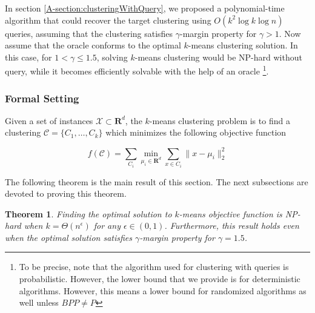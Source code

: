 \documentclass{article}
\newcommand{\mc}{\mathcal}
\newcommand{\mb}{\mathbf}
\newtheorem{theorem}{Theorem}
\begin{document}
In section \ref{A-section:clusteringWithQuery}, we proposed a polynomial-time algorithm that could recover the target clustering using $O(k^2\log k \log n)$ queries, assuming that the clustering satisfies $\gamma$-margin property for $\gamma>1$. Now assume that the oracle conforms to the optimal $k$-means clustering solution. In this case, for $1<\gamma\le 1.5$, solving $k$-means clustering would be NP-hard without query, while it becomes efficiently solvable with the help of an oracle \footnote{To be precise, note that the algorithm used for clustering with queries is probabilistic. However, the lower bound that we provide is for deterministic algorithms. However, this means a lower bound for randomized algorithms as well unless $BPP\neq P$}. 

\subsubsection{Formal Setting}

Given a set of instances $\mc X \subset \mb R ^d$, the $k$-means clustering problem is to find a clustering $\mc C = \{C_1, \ldots, C_k\}$ which minimizes the following objective function

$$f(\mc C) = \sum\limits_{C_i} \min\limits_{\mu_i\in {\mb R}^d}\sum\limits_{x\in C_i} \|x - \mu_i \|_2^2$$





The following theorem is the main result of this section. The next subsections are devoted to proving this theorem.

\begin{theorem}
\label{thm:gammaLower}
Finding the optimal solution to $k$-means objective function is NP-hard when $k=\Theta(n^\epsilon)$ for any $\epsilon \in (0,1)$. Furthermore, this result holds even when the optimal solution satisfies $\gamma$-margin property for $\gamma = 1.5$.


\end{theorem}
\end{document}
